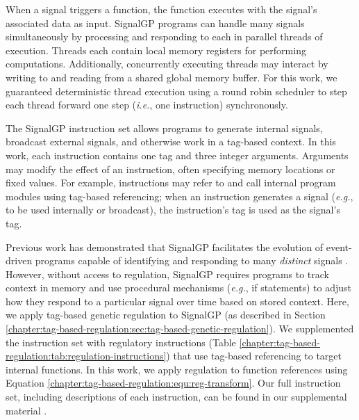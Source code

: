 
When a signal triggers a function, the function executes with the signal's associated data as input.
SignalGP programs can handle many signals simultaneously by processing and responding to each in parallel threads of execution.
Threads each contain local memory registers for performing computations.
Additionally, concurrently executing threads may interact by writing to and reading from a shared global memory buffer.
For this work, we guaranteed deterministic thread execution using a round robin scheduler to step each thread forward one step (\textit{i.e.}, one instruction) synchronously.


The SignalGP instruction set allows programs to generate internal signals, broadcast external signals, and otherwise work in a tag-based context. 
In this work, each instruction contains one tag and three integer arguments. 
Arguments may modify the effect of an instruction, often specifying memory locations or fixed values.
For example, instructions may refer to and call internal program modules using tag-based referencing; when an instruction generates a signal (\textit{e.g.}, to be used internally or broadcast), the instruction's tag is used as the signal's tag.



Previous work has demonstrated that SignalGP facilitates the evolution of event-driven programs capable of identifying and responding to many \textit{distinct} signals \citep{lalejini_what_2019}.
However, without access to regulation, SignalGP requires programs to track context in memory and use procedural mechanisms (\textit{e.g.}, if statements) to adjust how they respond to a particular signal over time based on stored context.
Here, we apply tag-based genetic regulation to SignalGP (as described in Section \ref{chapter:tag-based-regulation:sec:tag-based-genetic-regulation}).
We supplemented the instruction set with regulatory instructions (Table \ref{chapter:tag-based-regulation:tab:regulation-instructions}) that use tag-based referencing to target internal functions. 
In this work, we apply regulation to function references using Equation \ref{chapter:tag-based-regulation:equ:reg-transform}. 
Our full instruction set, including descriptions of each instruction, can be found in our supplemental material \citep{tag_regulation_supplement_2021}.

